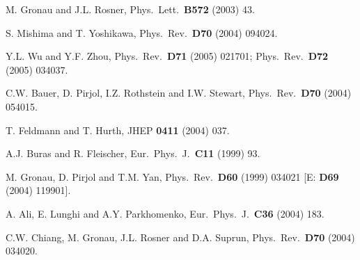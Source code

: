\documentclass[12pt]{article}
\begin{document}
\begin{thebibliography}{999}
M. Gronau and J.L. Rosner,
  { Phys.\ Lett.}~{\bf B572} (2003) 43.

S. Mishima and T. Yoshikawa,
  { Phys.\ Rev.}~{\bf D70} (2004) 094024.
  
Y.L. Wu and Y.F. Zhou,
  { Phys.\ Rev.}~{\bf D71} (2005) 021701;
  { Phys.\ Rev.}~{\bf D72} (2005) 034037.

C.W. Bauer, D. Pirjol, I.Z. Rothstein and I.W. Stewart,
  { Phys.\ Rev.}~{\bf D70} (2004) 054015.

T. Feldmann and T. Hurth,
  { JHEP} {\bf 0411} (2004) 037.

A.J. Buras and R. Fleischer,
  { Eur.\ Phys.\ J.}~{\bf C11} (1999) 93.

M. Gronau, D. Pirjol and T.M. Yan,
  { Phys.\ Rev.}~{\bf D60} (1999) 034021 
  [E: {\bf D69} (2004) 119901].

A. Ali, E. Lunghi and A.Y. Parkhomenko,
{ Eur.\ Phys.\ J.}~{\bf C36} (2004) 183.

C.W. Chiang, M. Gronau, J.L. Rosner and D.A. Suprun,
  { Phys.\ Rev.}~{\bf D70} (2004) 034020.


\end{thebibliography}
\end{document}
